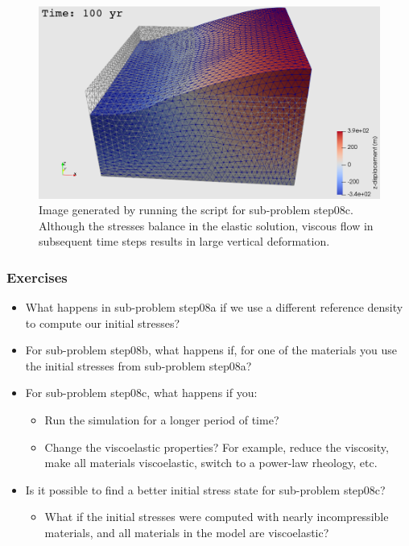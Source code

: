 \begin{figure}
  \includegraphics[width=4.5in]{examples/figs/subduction3d_step08c_soln}
  \caption{Image generated by running the 
    script for sub-problem step08c. Although the stresses balance in
    the elastic solution, viscous flow in subsequent time steps
    results in large vertical deformation.}
  \label{fig:example:subduction:3d:step08c}
\end{figure}

\subsubsection{Exercises}

\begin{itemize}
\item What happens in sub-problem step08a if we use a different
  reference density to compute our initial stresses?
\item For sub-problem step08b, what happens if, for one of the
  materials you use the initial stresses from sub-problem step08a?
\item For sub-problem step08c, what happens if you:
  \begin{itemize}
  \item Run the simulation for a longer period of time?
  \item Change the viscoelastic properties? For example, reduce the
    viscosity, make all materials viscoelastic, switch to a power-law
    rheology, etc.
  \end{itemize}
\item Is it possible to find a better initial stress state for
  sub-problem step08c?
  \begin{itemize}
  \item What if the initial stresses were computed with nearly
    incompressible materials, and all materials in the model are
    viscoelastic?
  \end{itemize}
\end{itemize}

